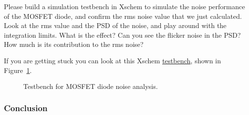 \documentclass[
  a4paper,
  DIV=11,
  numbers=noendperiod]{scrartcl}
\begin{document}
\begin{tcolorbox}[enhanced jigsaw, opacitybacktitle=0.6, colback=white, left=2mm, toptitle=1mm, opacityback=0, rightrule=.15mm, bottomrule=.15mm, breakable, arc=.35mm, toprule=.15mm, colframe=quarto-callout-tip-color-frame, colbacktitle=quarto-callout-tip-color!10!white, bottomtitle=1mm, titlerule=0mm, coltitle=black, leftrule=.75mm, title=\textcolor{quarto-callout-tip-color}{\faLightbulb}\hspace{0.5em}{Exercise}]

Please build a simulation testbench in Xschem to simulate the noise
performance of the MOSFET diode, and confirm the rms noise value that we
just calculated. Look at the rms value and the PSD of the noise, and
play around with the integration limits. What is the effect? Can you see
the flicker noise in the PSD? How much is its contribution to the rms
noise?

If you are getting stuck you can look at this Xschem
\href{./xschem/mosfet_diode_noise.sch}{testbench}, shown in
Figure~\ref{fig-mosfet-diode-noise-tb}.

\begin{figure}[H]


\caption{\label{fig-mosfet-diode-noise-tb}Testbench for MOSFET diode
noise analysis.}

\end{figure}%

\end{tcolorbox}

\subsubsection{Conclusion}\label{conclusion-1}
\end{document}
